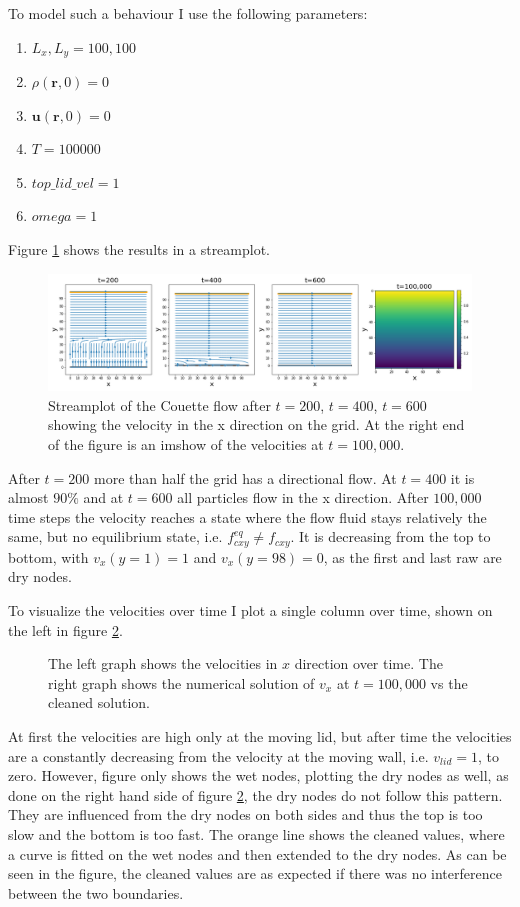 \documentclass[a4paper,12pt, oneside]{book}
\begin{document}
To model such a behaviour I use the following parameters:
\begin{enumerate}
    \item $L_{x}, L_{y} = 100, 100$
    \item $\rho(\textbf{r}, 0) = 0$
    \item $\textbf{u}(\textbf{r}, 0) = 0$
    \item $T = 100000$
    \item $top\_lid\_vel = 1$
    \item $omega = 1$
\end{enumerate}
Figure \ref{fig:m4-1-streamplot} shows the results in a streamplot.
\begin{figure}[ht]
\centering
\includegraphics[width=\columnwidth]{milestones/final/img/m4-1-streamplot.png}
\vspace*{-4mm}
\caption[Couette flow ]{Streamplot of the Couette flow after $t=200$, $t=400$, $t=600$ showing the velocity in the x direction on the grid. At the right end of the figure is an imshow of the velocities at $t=100,000$.}
\label{fig:m4-1-streamplot}
\end{figure}
After $t=200$ more than half the grid has a directional flow. At $t=400$ it is almost $90\%$ and at $t=600$ all particles flow in the x direction. After $100,000$ time steps the velocity reaches a state where the flow fluid stays relatively the same, but no equilibrium state, i.e. $f^{eq}_{cxy}\neq f_{cxy}$. 
It is decreasing from the top to bottom, with $v_{x}(y=1)=1$ and $v_{x}(y=98)=0$, as the first and last raw are dry nodes.

To visualize the velocities over time I plot a single column over time, shown on the left in figure \ref{fig:m4-1-velocities-over-time}.
\begin{figure}[ht]
\centering
\resizebox{\columnwidth}{!}{\large}
\caption[Column velocities over time]{The left graph shows the velocities in $x$ direction over time. The right graph shows the numerical solution of $v_{x}$ at $t=100,000$ vs the cleaned solution.}
\label{fig:m4-1-velocities-over-time}
\end{figure}
At first the velocities are high only at the moving lid, but after time the velocities are a constantly decreasing from the velocity at the moving wall, i.e. $v_{lid}=1$, to zero.
However, figure only shows the wet nodes, plotting the dry nodes as well, as done on the right hand side of figure \ref{fig:m4-1-velocities-over-time}, the dry nodes do not follow this pattern. They are influenced from the dry nodes on both sides and thus the top is too slow and the bottom is too fast.
The orange line shows the cleaned values, where a curve is fitted on the wet nodes and then extended to the dry nodes. As can be seen in the figure, the cleaned values are as expected if there was no interference between the two boundaries.
\end{document}
